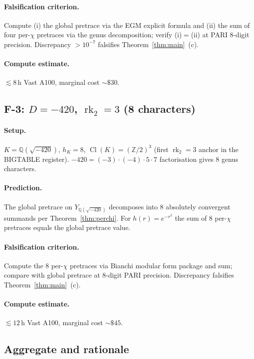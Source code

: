 \documentclass[11pt,a4paper,reqno]{amsart}
\theoremstyle{definition}
\DeclareMathOperator{\Cl}{Cl}
\DeclareMathOperator{\rk}{rk}
\newcommand{\QQ}{\mathbb{Q}}
\newcommand{\ZZ}{\mathbb{Z}}
\begin{document}
\paragraph{Falsification criterion.}
Compute (i) the global pretrace via the EGM explicit formula and (ii) the sum of four per-$\chi$ pretraces via the genus decomposition; verify (i)$=$(ii) at PARI 8-digit precision. Discrepancy $>10^{-7}$ falsifies Theorem~\ref{thm:main}~(c).

\paragraph{Compute estimate.}
$\lesssim 8$\,h Vast A100, marginal cost $\sim\$30$.

\subsection{F-3: $D=-420$, $\rk_2=3$ (8 characters)}\label{ss:F3}

\paragraph{Setup.}
$K=\QQ(\sqrt{-420})$, $h_K=8$, $\Cl(K)=(\ZZ/2)^3$ (first $\rk_2=3$ anchor in the BIGTABLE register). $-420=(-3)\cdot(-4)\cdot 5\cdot 7$ factorisation gives 8 genus characters.

\paragraph{Prediction.}
The global pretrace on $Y_{\QQ(\sqrt{-420})}$ decomposes into 8 absolutely convergent summands per Theorem~\ref{thm:perchi}. For $h(r)=e^{-r^2}$ the sum of 8 per-$\chi$ pretraces equals the global pretrace value.

\paragraph{Falsification criterion.}
Compute the 8 per-$\chi$ pretraces via Bianchi modular form package and sum; compare with global pretrace at 8-digit PARI precision. Discrepancy falsifies Theorem~\ref{thm:main}~(c).

\paragraph{Compute estimate.}
$\lesssim 12$\,h Vast A100, marginal cost $\sim\$45$.

\subsection{Aggregate and rationale}\label{ss:F_total}
\end{document}

